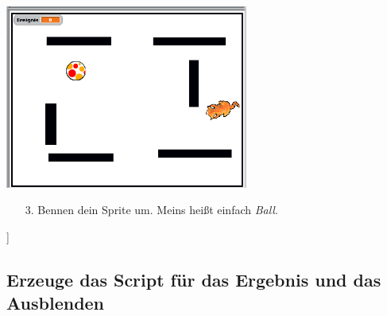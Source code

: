 \includegraphics[width=0.6\textwidth]{images/aufgabe3_schrumpfen2.png}
\begin{itemize}
\item[3.] Bennen dein Sprite um. Meins heißt einfach \textit{Ball}.
\end{itemize}]

\subsection{Erzeuge das Script für das Ergebnis und das Ausblenden}

